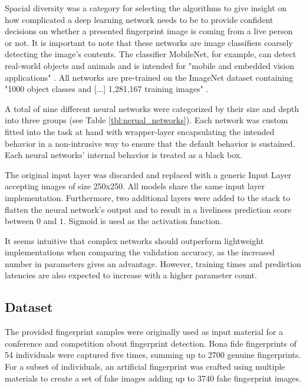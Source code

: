 Spacial diversity was a category for selecting the algorithms to give insight on how complicated a deep learning network needs to be to provide confident decisions on whether a presented fingerprint image is coming from a live person or not.
It is important to note that these networks are image classifiers coarsely detecting the image's contents.
The classifier MobileNet, for example, can detect real-world objects and animals and is intended for "mobile and embedded vision applications" \cite{MBNET}.
All networks are pre-trained on the ImageNet dataset containing "1000 object classes and [...] 1,281,167 training images" \cite{ImageNet}. 





A total of nine different neural networks were categorized by their size and depth into three groups (see Table \ref{tbl:nerual_networks}).
Each network was custom fitted into the task at hand with wrapper-layer encapsulating the intended behavior in a non-intrusive way to ensure that the default behavior is sustained.
Each neural networks' internal behavior is treated as a black box.

The original input layer was discarded and replaced with a generic Input Layer accepting images of size 250x250. All models share the same input layer implementation.
Furthermore, two additional layers were added to the stack to flatten the neural network's output and to result in a liveliness prediction score between $0$ and $1$.
Sigmoid is used as the activation function.

It seems intuitive that complex networks should outperform lightweight implementations when comparing the validation accuracy, as the increased number in parameters gives an advantage.
However, training times and prediction latencies are also expected to increase with a higher parameter count.



\subsection{Dataset}
The provided fingerprint samples were originally used as input material for a conference and competition about fingerprint detection.
Bona fide fingerprints of 54 individuals were captured five times, summing up to 2700 genuine fingerprints.
For a subset of individuals, an artificial fingerprint was crafted using multiple materials to create a set of fake images adding up to 3740 fake fingerprint images.


